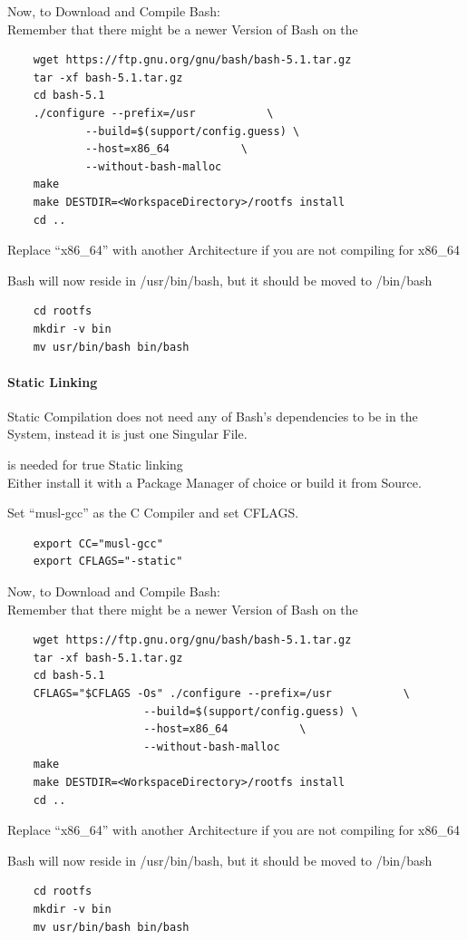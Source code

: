 \documentclass{article}
\begin{document}
		Now, to Download and Compile Bash:
		\\
		Remember that there might be a newer Version of Bash on the 
		\begin{lstlisting}
	wget https://ftp.gnu.org/gnu/bash/bash-5.1.tar.gz
	tar -xf bash-5.1.tar.gz
	cd bash-5.1
	./configure --prefix=/usr		    \
		    --build=$(support/config.guess) \
		    --host=x86_64		    \
		    --without-bash-malloc
	make
	make DESTDIR=<WorkspaceDirectory>/rootfs install
	cd ..
		\end{lstlisting}
		Replace ``x86_64'' with another Architecture if you are not compiling for x86_64

		Bash will now reside in /usr/bin/bash, but it should be moved to /bin/bash
		\begin{lstlisting}
	cd rootfs
	mkdir -v bin
	mv usr/bin/bash bin/bash
		\end{lstlisting}
		\paragraph{Static Linking}
		\label{BashStatic}
		Static Compilation does not need any of Bash's dependencies to be in the System, instead it is just one Singular File.

		 is needed for true Static linking
		\\ Either install it with a Package Manager of choice or build it from Source.

		Set ``musl-gcc'' as the C Compiler and set CFLAGS.
		\begin{lstlisting}
	export CC="musl-gcc"
	export CFLAGS="-static"
		\end{lstlisting}
		Now, to Download and Compile Bash:
		\\
		Remember that there might be a newer Version of Bash on the 
		\begin{lstlisting}
	wget https://ftp.gnu.org/gnu/bash/bash-5.1.tar.gz
	tar -xf bash-5.1.tar.gz
	cd bash-5.1
	CFLAGS="$CFLAGS -Os" ./configure --prefix=/usr			 \
					 --build=$(support/config.guess) \
					 --host=x86_64			 \
					 --without-bash-malloc
	make
	make DESTDIR=<WorkspaceDirectory>/rootfs install
	cd ..
		\end{lstlisting}
		Replace ``x86_64'' with another Architecture if you are not compiling for x86_64

		Bash will now reside in /usr/bin/bash, but it should be moved to /bin/bash
		\begin{lstlisting}
	cd rootfs
	mkdir -v bin
	mv usr/bin/bash bin/bash
		\end{lstlisting}
\end{document}
